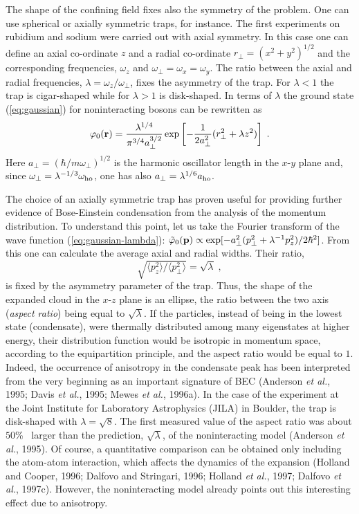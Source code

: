 The shape of the confining field fixes also the symmetry of the
problem. One can use spherical or axially symmetric
traps, for instance. The first experiments on rubidium and sodium
were carried out with axial symmetry. In this case one can
define an axial co-ordinate $z$ and a radial co-ordinate
$r_\perp = (x^2 +y^2)^{1/2}$ and the corresponding frequencies,
$\omega_z$ and $\omega_\perp=\omega_x=\omega_y$. The ratio between 
the axial and radial frequencies, $\lambda = \omega_z / \omega_\perp$, 
fixes the asymmetry of the trap. For $\lambda < 1$ the trap is
cigar-shaped while for $\lambda > 1$  is disk-shaped. In terms of $\lambda$ 
the ground state (\ref{eq:gaussian}) for noninteracting bosons
can be rewritten as
\begin{equation}
\varphi_0 ({\bf r}) = { \lambda^{1/4}
\over \pi^{3/4} a_\perp^{3/2} }
\exp \left[ - {1 \over  2 a_\perp^2 }(r_\perp^2 +
\lambda z^2) \right]
\; .
\label{eq:gaussian-lambda}
\end{equation}
Here $a_\perp =(\hbar /m\omega_\perp)^{1/2}$ is the harmonic
oscillator length  in the $x$-$y$ plane and, since $\omega_\perp = 
\lambda^{-1/3} \omega_{\rm ho}$, one has also $a_\perp = 
\lambda^{1/6} a_{\rm ho}$. 

The choice of an axially symmetric trap has proven useful
for providing further evidence of Bose-Einstein condensation
from the analysis of the momentum distribution. To understand 
this point, let us take the Fourier transform of the wave function
(\ref{eq:gaussian-lambda}): $\tilde \varphi_0 ({\bf p}) \propto  
\exp [ -a^2_\perp (p^2_\perp + \lambda^{-1} p^2_z )/2\hbar^2]$. From 
this one can calculate the average axial and radial widths. Their ratio,
\begin{equation}
\sqrt{ \langle p^2_z \rangle /  \langle p^2_\perp \rangle }
=  \sqrt{\lambda} \; , 
\label{eq:arho}
\end{equation}
is fixed by the asymmetry parameter of the trap. Thus,
the shape of the expanded cloud in the $x$-$z$ plane is 
an ellipse,  the ratio between the two axis ({\it aspect ratio})
being equal to $\sqrt{\lambda}$. If the particles, instead of being
in the lowest state (condensate), were thermally distributed among many
eigenstates at higher energy, their distribution function would be
isotropic in momentum space, according to the equipartition principle,
and the aspect ratio would be equal to $1$. Indeed, the occurrence
of anisotropy in the condensate peak has been  interpreted 
from the very beginning as an important signature of BEC (Anderson
{\it et al.}, 1995; Davis {\it et al.}, 1995; Mewes {\it et al.}, 1996a).
In the case of the experiment at the Joint Institute for Laboratory 
Astrophysics (JILA) in Boulder, the trap is disk-shaped with
$\lambda=\sqrt{8}$. The first measured value of the aspect ratio was
about $50$\% \  larger than the prediction, $\sqrt{\lambda}$,  of the
noninteracting model  (Anderson {\it et al.}, 1995).  Of course, a 
quantitative comparison can be obtained only including the atom-atom
interaction, which affects the dynamics of the expansion (Holland and
Cooper, 1996; Dalfovo and Stringari, 1996; Holland {\it et al.}, 1997;
Dalfovo {\it et al.}, 1997c). However, the noninteracting model already
points out this interesting effect due to anisotropy.


